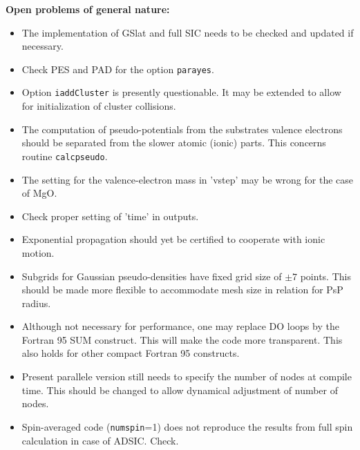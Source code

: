 \documentclass[12pt]{article}
\begin{document}
\newpage

{\Large\bf Open problems of general nature:}
\begin{itemize}
  \item The implementation of GSlat and full SIC needs to be checked
        and updated if necessary.
  \item Check PES and PAD for the option  {\tt parayes}.
  \item Option {\tt iaddCluster} is presently questionable. 
        It may be extended to allow
        for initialization of cluster collisions.
  \item The computation of pseudo-potentials from the substrates
        valence electrons should be separated from the slower
        atomic (ionic) parts. This concerns routine {\tt calcpseudo}.
  \item The setting for the valence-electron mass in 'vstep'
        may be wrong for the case of MgO.
  \item Check proper setting of 'time' in outputs.
  \item Exponential propagation should yet be certified to cooperate
        with ionic motion.
  \item Subgrids for Gaussian pseudo-densities have fixed grid size
        of $\pm 7$ points. This should be made more flexible to
        accommodate mesh size in relation for PsP radius.
  \item Although not necessary for performance, one may replace
        DO loops by the Fortran 95 SUM construct. This will make the
        code more transparent. This also holds for other compact
        Fortran 95 constructs.
  \item Present parallele version  still needs to specify the number
        of nodes at compile time. This should be 
        changed to allow dynamical adjustment of number of nodes.
  \item Spin-averaged code ({\tt numspin}=1) does not reproduce 
        the results from full spin calculation in case of ADSIC.
        Check.
\end{itemize}
\end{document}
